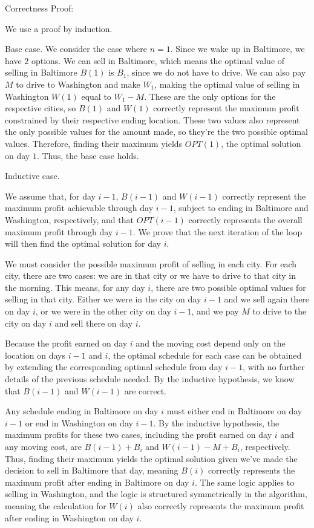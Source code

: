 \documentclass[11pt]{article}
\begin{document}
\bigbreak

Correctness Proof:

We use a proof by induction.

Base case. We consider the case where $n=1$. Since we wake up in Baltimore, we have $2$ options. 
We can sell in Baltimore, which means the optimal value of selling in Baltimore $B(1)$ is $B_1$, since we do not have to drive. 
We can also pay $M$ to drive to Washington and make $W_1$, making the optimal value of selling in Washington $W(1)$ equal to $W_1 - M$. 
These are the only options for the respective cities, so $B(1)$ and $W(1)$ correctly represent the maximum profit constrained by their respective 
ending location. These two values also represent the only possible values for the amount made, so they're the two possible optimal values. 
Therefore, finding their maximum yields $OPT(1)$, the optimal solution on day $1$. Thus, the base case holds.

Inductive case. 

We assume that, for day $i-1$, $B(i-1)$ and $W(i-1)$ correctly represent the maximum profit achievable through day $i-1$, 
subject to ending in Baltimore and Washington, respectively, and that $OPT(i-1)$ correctly represents the overall maximum profit through day $i-1$. 
We prove that the next iteration of the loop will then find the optimal solution for day $i$. 

We must consider the possible maximum profit of selling in each city. For each city, there are two cases: 
we are in that city or we have to drive to that city in the morning. This means, for any day $i$, there are two possible optimal values for selling 
in that city. Either we were in the city on day $i-1$ and we sell again there on day $i$, or we were in the other city on day $i-1$, 
and we pay $M$ to drive to the city on day $i$ and sell there on day $i$. 

Because the profit earned on day $i$ and the moving cost depend only on the location on days $i-1$ and $i$, 
the optimal schedule for each case can be obtained by extending the corresponding optimal schedule from day $i-1$, with no further
details of the previous schedule needed. By the inductive hypothesis, we know that $B(i-1)$ and $W(i-1)$ are correct. 

Any schedule ending in Baltimore on day $i$ must either end in Baltimore on day $i-1$ or end in Washington on day $i-1$. 
By the inductive hypothesis, the maximum profits for these two cases, including the profit earned on day $i$ and any moving cost, 
are $B(i-1) + B_i$ and $W(i-1) - M + B_i$, respectively. Thus, finding their maximum yields the optimal solution given we've 
made the decision to sell in Baltimore that day, meaning $B(i)$ correctly represents the maximum profit after ending in Baltimore on day $i$. 
The same logic applies to selling in Washington, and the logic is structured symmetrically in the algorithm, meaning the calculation for $W(i)$ also 
correctly represents the maximum profit after ending in Washington on day $i$. 
\end{document}
